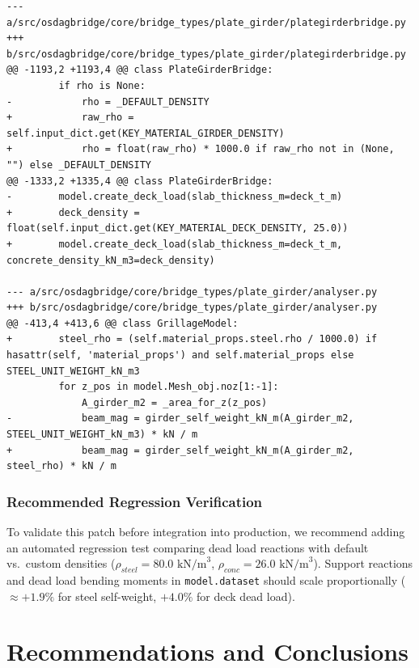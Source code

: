 \documentclass[11pt,a4paper]{article}
\begin{document}
\begin{lstlisting}
--- a/src/osdagbridge/core/bridge_types/plate_girder/plategirderbridge.py
+++ b/src/osdagbridge/core/bridge_types/plate_girder/plategirderbridge.py
@@ -1193,2 +1193,4 @@ class PlateGirderBridge:
         if rho is None:
-            rho = _DEFAULT_DENSITY
+            raw_rho = self.input_dict.get(KEY_MATERIAL_GIRDER_DENSITY)
+            rho = float(raw_rho) * 1000.0 if raw_rho not in (None, "") else _DEFAULT_DENSITY
@@ -1333,2 +1335,4 @@ class PlateGirderBridge:
-        model.create_deck_load(slab_thickness_m=deck_t_m)
+        deck_density = float(self.input_dict.get(KEY_MATERIAL_DECK_DENSITY, 25.0))
+        model.create_deck_load(slab_thickness_m=deck_t_m, concrete_density_kN_m3=deck_density)

--- a/src/osdagbridge/core/bridge_types/plate_girder/analyser.py
+++ b/src/osdagbridge/core/bridge_types/plate_girder/analyser.py
@@ -413,4 +413,6 @@ class GrillageModel:
+        steel_rho = (self.material_props.steel.rho / 1000.0) if hasattr(self, 'material_props') and self.material_props else STEEL_UNIT_WEIGHT_kN_m3
         for z_pos in model.Mesh_obj.noz[1:-1]:
             A_girder_m2 = _area_for_z(z_pos)
-            beam_mag = girder_self_weight_kN_m(A_girder_m2, STEEL_UNIT_WEIGHT_kN_m3) * kN / m
+            beam_mag = girder_self_weight_kN_m(A_girder_m2, steel_rho) * kN / m
\end{lstlisting}

\subsubsection*{Recommended Regression Verification}
To validate this patch before integration into production, we recommend adding an automated regression test comparing dead load reactions with default vs.\ custom densities ($\rho_{steel} = 80.0\text{ kN/m}^3$, $\rho_{conc} = 26.0\text{ kN/m}^3$). Support reactions and dead load bending moments in \texttt{model.dataset} should scale proportionally ($\approx +1.9\%$ for steel self-weight, $+4.0\%$ for deck dead load).

\newpage
\section{Recommendations and Conclusions}
\end{document}
